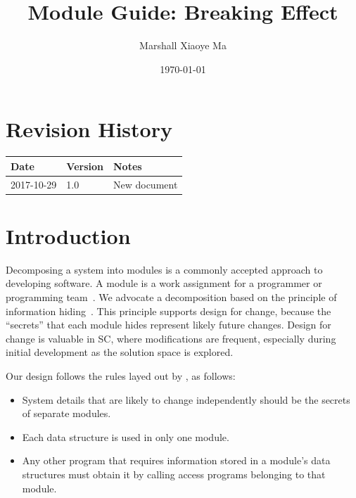 \documentclass[12pt, titlepage]{article}
\begin{document}
	
	\title{Module Guide: Breaking Effect} 
	\author{Marshall Xiaoye Ma}
	\date{\today}
	
	\maketitle
	
	
	\section{Revision History}
	
	\begin{tabularx}{\textwidth}{p{3cm}p{2cm}X}
		\toprule {\bf Date} & {\bf Version} & {\bf Notes}\\
		\midrule
		2017-10-29 & 1.0 & New document\\
		\bottomrule
	\end{tabularx}
	
	\newpage
	
	\tableofcontents
	
	\listoftables
	
	\listoffigures
	
	\newpage
	
	
	\section{Introduction}
	
	Decomposing a system into modules is a commonly accepted approach to developing
	software.  A module is a work assignment for a programmer or programming
	team~\citep{ParnasEtAl1984}.  We advocate a decomposition
	based on the principle of information hiding~\citep{Parnas1972a}.  This
	principle supports design for change, because the ``secrets'' that each module
	hides represent likely future changes.  Design for change is valuable in SC,
	where modifications are frequent, especially during initial development as the
	solution space is explored.  
	
	Our design follows the rules layed out by \citet{ParnasEtAl1984}, as follows:
	
	\begin{itemize}
		\item System details that are likely to change independently should be the
		secrets of separate modules.
		\item Each data structure is used in only one module.
		\item Any other program that requires information stored in a module's data
		structures must obtain it by calling access programs belonging to that module.
	\end{itemize}
	
\end{document}
